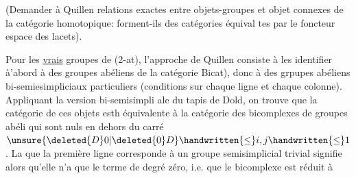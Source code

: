 (Demander à Quillen relations exactes entre objets-groupes et objet
connexes de la catégorie homotopique: forment-ils des catégories équival
tes par le foncteur espace des lacets).

Pour les \uline{vrais} groupes  de (2-at), l'approche de Quillen consiste à
les identifier à'abord à des groupes abéliens de la catégorie \handwritten{(}Bicat),
donc à des grpupes abéliens bi-semiesimpliciaux particuliers (conditions
sur chaque ligne et chaque colonne). Appliquant la version bi-semisimpli
ale du tapis de Dold, on trouve que  la catégorie de ces objets
esth équivalente à la catégorie des  bicomplexes  de groupes abéli
qui sont nuls en dehors du carré $\unsure{\deleted{D}0|\deleted{0}D}\handwritten{\leq}i,j\handwritten{\leq}1$.  La 
que la première ligne corresponde à un  groupe semisimplicial
trivial signifie alors qu'elle n'a que le terme de degré zéro, i.e. que
le bicomplexe est réduit à


